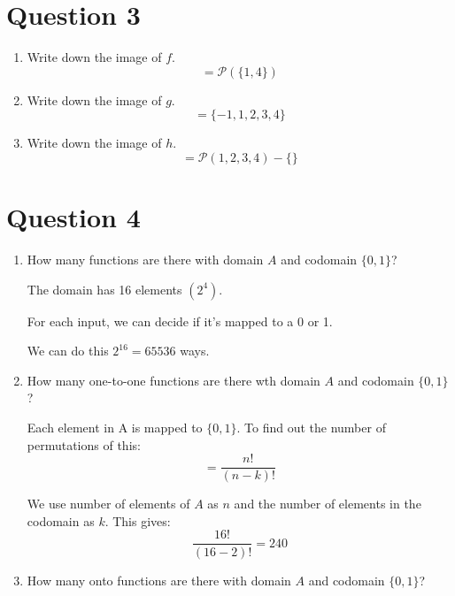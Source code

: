 \documentclass[11pt]{article}
\begin{document}
\section*{Question 3}

\begin{enumerate}[label=(\roman*)]
  \item Write down the image of $f$.
  $$= \mathcal{P}(\{1,4\})$$
 
  \item Write down the image of $g$.
  $$= \{-1, 1, 2, 3, 4\}$$
  
  
  \item Write down the image of $h$.
  $$= \mathcal{P}(1,2,3,4) -  \{\}$$
\end{enumerate}

\section*{Question 4}

\begin{enumerate}[label=(\roman*)]
  \item How many functions are there with domain $A$ and codomain $\{0,1\}$?
  
  The domain has 16 elements $(2^4)$.
  
  For each input, we can decide if it's mapped to a 0 or 1.
  
  We can do this $2^{16} = 65536$ ways.
  
  \item How many one-to-one functions are there wth domain $A$ and codomain $\{0,1\}$?
  
  Each element in A is mapped to $\{0,1\}$. To find out the number of permutations of this:
  $$= \frac{n!}{(n-k)!}$$
  
  We use number of elements of $A$ as $n$ and the number of elements in the codomain as $k$. This gives:
  $$\frac{16!}{(16-2)!} = 240$$
  
  \item How many onto functions are there with domain $A$ and codomain $\{0,1\}$?
\end{enumerate}
\end{document}
